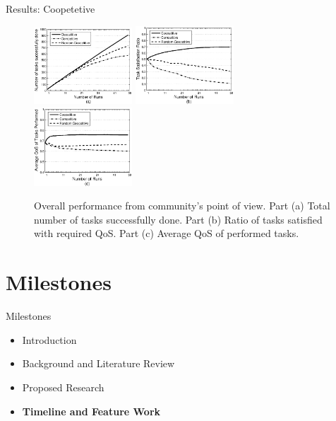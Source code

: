 \documentclass{beamer}
\begin{document}
\begin{frame}{Results: Coopetetive}
    \begin{figure}[h]
        \centering
        \includegraphics[width=1.45in]{figures/graphtaskdone.eps}
        \includegraphics[width=1.45in]{figures/graphtasksatisfaction.eps}
        \includegraphics[width=1.45in]{figures/graphavgqostask.eps}
        \caption{Overall performance from community's point of view. Part
        (a) Total number of tasks successfully done. Part (b) Ratio of
        tasks satisfied with required QoS. Part (c) Average QoS of
        performed tasks.} \label{graph_task}
    \end{figure}
\end{frame}




\section{Milestones}
\begin{frame}{Milestones}
    \begin{itemize}
     	\itemsep=.5cm
    	\item Introduction
    	\item Background and Literature Review
    	\item Proposed Research
    	\item {\bf Timeline and Feature Work}
    \end{itemize}
\end{frame}
\end{document}
